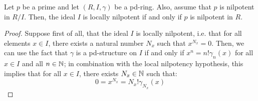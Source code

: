             \begin{proposition} \label{prop: p_powers_in_pd_rings}
                Let $p$ be a prime and let $(R, I , \gamma)$ be a pd-ring. Also, assume that $p$ is nilpotent in $R/I$. Then, the ideal $I$ is locally nilpotent if and only if $p$ is nilpotent in $R$. 
            \end{proposition}
                \begin{proof}
                    Suppose first of all, that the ideal $I$ is locally nilpotent, i.e. that for all elements $x \in I$, there exists a natural number $N_x$ such that $x^{N_x} = 0$. Then, we can use the fact that $\gamma$ is a pd-structure on $I$ if and only if $x^n = n!\gamma_n(x)$ for all $x \in I$ and all $n \in \mathbb{N}$; in combination with the local nilpotency hypothesis, this implies that for all $x \in I$, there exists $N_x \in \mathbb{N}$ such that:
                        $$0 = x^{N_x} = N_x!\gamma_{N_x}(x)$$
                \end{proof}
                
